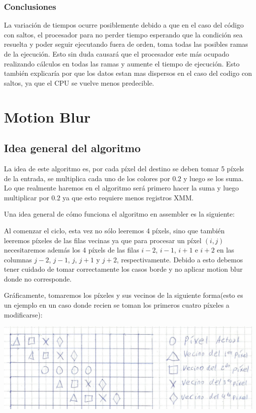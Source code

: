 \documentclass[a4paper]{article}
\begin{document}
\subsubsection{Conclusiones}

La variación de tiempos ocurre posiblemente debido a que en el caso del código con saltos, el procesador para no perder tiempo esperando que la condición sea resuelta y poder seguir ejecutando fuera de orden, toma todas las posibles ramas de la ejecución. Esto sin duda causará que el procesador este más ocupado realizando cálculos en todas las ramas y aumente el tiempo de ejecución. Esto también explicaría por que los datos estan mas dispersos en el caso del codigo con saltos, ya que el CPU se vuelve menos predecible.

\newpage
\section{Motion Blur}
\subsection{Idea general del algoritmo}
La idea de este algoritmo es, por cada píxel del destino se deben tomar 5 píxels de la entrada, se multiplica cada uno de los colores por $0.2$ y luego se los suma. Lo que realmente haremos en el algoritmo será primero hacer la suma y luego multiplicar por $0.2$ ya que esto requiere menos registros XMM.

Una idea general de cómo funciona el algoritmo en assembler es la siguiente:

Al comenzar el ciclo, esta vez no sólo leeremos 4 píxels, sino que también leeremos píxeles de las filas vecinas ya que para procesar un píxel $(i,j)$ necesitaremos además los 4 píxels de las filas $i-2$, $i-1$, $i+1$ e $i+2$ en las columnas $j-2$, $j-1$, $j$, $j+1$ y $j+2$, respectivamente. Debido a esto debemos tener cuidado de tomar correctamente los casos borde y no aplicar motion blur donde no corresponde.

Gráficamente, tomaremos los píxeles y sus vecinos de la siguiente forma(esto es un ejemplo en un caso donde recien se toman los primeros cuatro píxeles a modificarse):

\begin{center}
\includegraphics[scale=0.66]{Dibujos/MB1.jpg}
\end{center}
\end{document}
